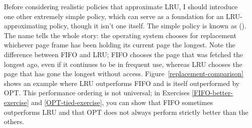 Before considering realistic policies that approximate LRU, I should
introduce one other extremely simple policy, which can serve as a
foundation for an LRU-approximating policy, though it isn't one
itself. The simple policy is known as  ().  The name tells the whole story: the operating
system chooses for replacement whichever page frame has been holding
its current page the longest.  Note the difference between FIFO and
LRU; FIFO chooses the page that was fetched the longest ago, even if
it continues to be in frequent use, whereas LRU chooses the page that
has gone the longest without access.
Figure~\ref{replacement-comparison} shows an example where LRU
outperforms FIFO and is itself outperformed by OPT.
This performance ordering is not universal; in Exercises \ref{FIFO-better-exercise} and \ref{OPT-tied-exercise},
you can show that FIFO sometimes outperforms LRU and that OPT does
not always perform strictly better than the others.
